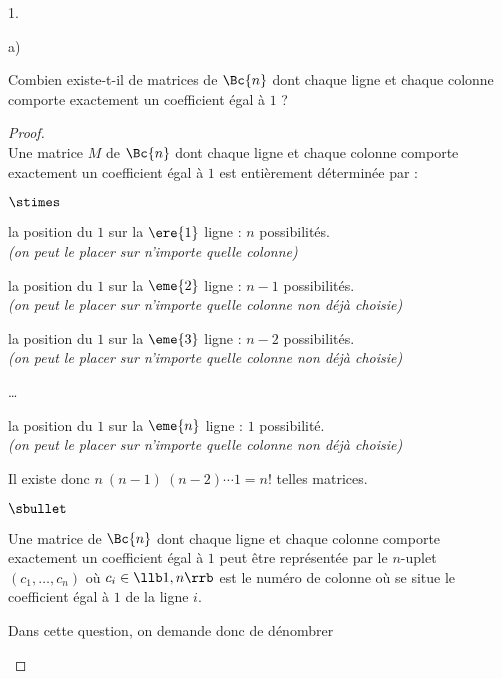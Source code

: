 \documentclass[11pt]{article}%
\begin{document}
\begin{noliste}{1.}
\begin{noliste}{a)}
  \item Combien existe-t-il de matrices de $\Bc{n}$ dont chaque ligne
    et chaque colonne comporte exactement un coefficient égal à $1$
    ?
	
    \begin{proof}~\\
      Une matrice $M$ de $\Bc{n}$ dont chaque ligne et chaque colonne
      comporte exactement un coefficient égal à $1$ est entièrement
      déterminée par :
      \begin{noliste}{$\stimes$}
      \item la position du $1$ sur la $\ere{1}$ ligne : $n$
        possibilités.\\
        {\it (on peut le placer sur n'importe quelle colonne)}
      \item la position du $1$ sur la $\eme{2}$ ligne : $n-1$
        possibilités.\\
        {\it (on peut le placer sur n'importe quelle colonne non déjà
          choisie)}
      \item la position du $1$ sur la $\eme{3}$ ligne : $n-2$
        possibilités.\\
        {\it (on peut le placer sur n'importe quelle colonne non déjà
          choisie)}
      \item \ldots
      \item la position du $1$ sur la $\eme{n}$ ligne : $1$
        possibilité.\\
        {\it (on peut le placer sur n'importe quelle colonne non déjà
          choisie)}
      \end{noliste}
      Il existe donc $n \ (n-1) \ (n-2) \cdots 1 = n!$ telles
      matrices.~\\[-.8cm]%
      \begin{remark}%
        \begin{noliste}{$\sbullet$}
        \item Une matrice de $\Bc{n}$ dont chaque ligne et chaque
          colonne comporte exactement un coefficient égal à $1$
          peut être représentée par le $n$-uplet $(c_1, \ldots, c_n)$
          où $c_i \in \llb 1, n \rrb$ est le numéro de colonne où se
          situe le coefficient égal à $1$ de la ligne $i$.
        \item Dans cette question, on demande donc de dénombrer

\end{noliste}
\end{remark}
\end{proof}
\end{noliste}
\end{noliste}
\end{document}
